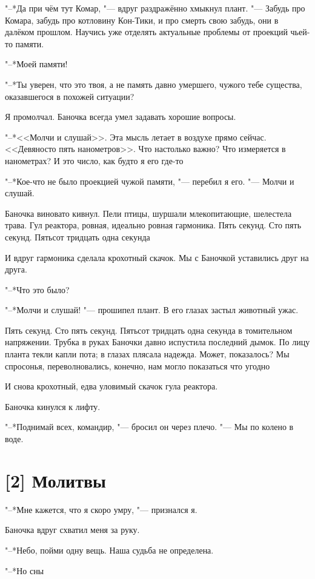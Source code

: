 "--*Да при чём тут Комар, "--- вдруг раздражённо хмыкнул плант.
"--- Забудь про Комара, забудь про котловину Кон-Тики, и про смерть свою забудь, они в далёком прошлом.
Научись уже отделять актуальные проблемы от проекций чьей-то памяти.

"--*Моей памяти!

"--*Ты уверен, что это твоя, а не память давно умершего, чужого тебе существа, оказавшегося в похожей ситуации?

Я промолчал.
Баночка всегда умел задавать хорошие вопросы.

"--*<<Молчи и слушай>>.
Эта мысль летает в воздухе прямо сейчас.
<<Девяносто пять нанометров>>.
Что настолько важно?
Что измеряется в нанометрах?
И это число, как будто я его где-то\ldotst

"--*Кое-что не было проекцией чужой памяти, "--- перебил я его.
"--- Молчи и слушай.

Баночка виновато кивнул.
Пели птицы, шуршали млекопитающие, шелестела трава.
Гул реактора, ровная, идеально ровная гармоника.
Пять секунд.
Сто пять секунд.
Пятьсот тридцать одна секунда\ldotst

И вдруг гармоника сделала крохотный скачок.
Мы с Баночкой уставились друг на друга.

"--*Что это было?

"--*Молчи и слушай! "--- прошипел плант.
В его глазах застыл животный ужас.

Пять секунд.
Сто пять секунд.
Пятьсот тридцать одна секунда в томительном напряжении.
Трубка в руках Баночки давно испустила последний дымок.
По лицу планта текли капли пота;
в глазах плясала надежда.
Может, показалось?
Мы спросонья, переволновались, конечно, нам могло показаться что угодно\ldotst

И снова крохотный, едва уловимый скачок гула реактора.

Баночка кинулся к лифту.

"--*Поднимай всех, командир, "--- бросил он через плечо.
"--- Мы по колено в воде.

\section{[2] Молитвы}

"--*Мне кажется, что я скоро умру, "--- признался я.

Баночка вдруг схватил меня за руку.

"--*Небо, пойми одну вещь.
Наша судьба не определена.

"--*Но сны\ldotst

